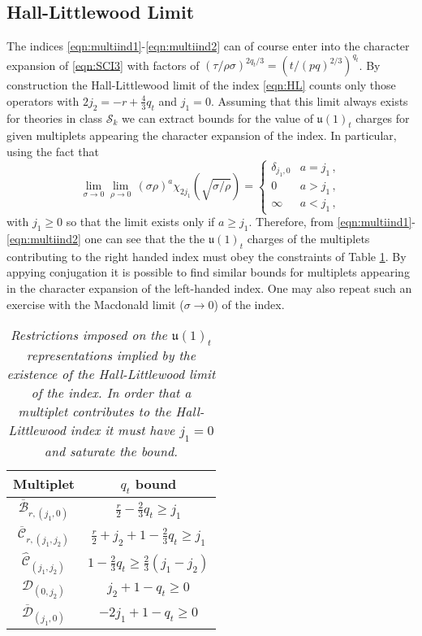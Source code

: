 \documentclass[main.tex]{subfiles}
\begin{document}
\subsection{Hall-Littlewood Limit}
The indices \eqref{eqn:multiind1}-\eqref{eqn:multiind2} can of course enter into the character expansion of \eqref{eqn:SCI3} with factors of $\left(\tau/\rho\sigma\right)^{2q_t/3}=(t/(pq)^{2/3})^{q_t}$. By construction the Hall-Littlewood limit of the index \eqref{eqn:HL} counts only those operators with $2j_2=-r+\frac{4}{3}q_t$ and $j_1=0$. Assuming that this limit always exists for theories in class $\mathcal{S}_k$ we can extract bounds for the value of $\mathfrak{u}(1)_t$ charges for given multiplets appearing the character expansion of the index. In particular, using the fact that
\begin{equation}
\lim_{\sigma\to0}\lim_{\rho\to0}\,(\sigma\rho)^a\chi_{2j_1}\left(\sqrt{\sigma/\rho}\right)=\begin{cases}
\delta_{j_1,0}&a=j_1\,,\\
0&a> j_1\,,\\
\infty&a<j_1\,,
\end{cases}
\end{equation}
with $j_1\geq0$ so that the limit exists only if $a\geq j_1$. Therefore, from \eqref{eqn:multiind1}-\eqref{eqn:multiind2} one can see that the the $\mathfrak{u}(1)_t$ charges of the multiplets contributing to the right handed index must obey the constraints of Table \ref{tab:HLconstraint}. By appying conjugation it is possible to find similar bounds for multiplets appearing in the character expansion of the left-handed index. One may also repeat such an exercise with the Macdonald limit ($\sigma\to0$) of the index. 
\begin{table}
\centering
\begin{tabular}{|c|c|}
\hline
Multiplet&$q_t$ bound\\\hline\hline
$\overline{\mathcal{B}}_{r,(j_1,0)}$&$\frac{r}{2}-\frac{2}{3}q_t\geq j_1$\\\hline
$\overline{\mathcal{C}}_{r,(j_1,j_2)}$&$\frac{r}{2}+j_2+1-\frac{2}{3}q_t\geq j_1$\\\hline
$\hat{\mathcal{C}}_{(j_1,j_2)}$&$1-\frac{2}{3}q_t\geq\frac{2}{3}(j_1-j_2)	$\\\hline
$\mathcal{D}_{(0,j_2)}$&$j_2+1-q_t\geq0$\\\hline
$\overline{\mathcal{D}}_{(j_1,0)}$&$-2j_1+1-q_t\geq0$\\\hline
\end{tabular}
\caption{\it Restrictions imposed on the $\mathfrak{u}(1)_t$ representations implied by the existence of the Hall-Littlewood limit of the index. In order that a multiplet contributes to the Hall-Littlewood index it must have $j_1=0$ and saturate the bound.}
\label{tab:HLconstraint}
\end{table}
\end{document}
